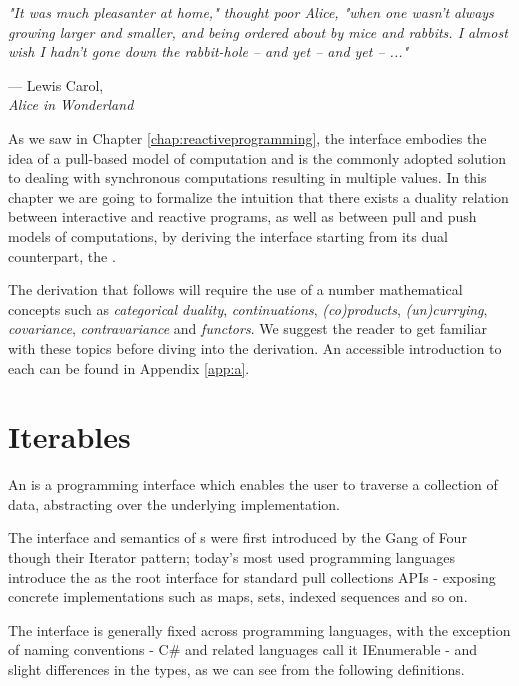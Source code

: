 \let\textcircled=\pgftextcircled
{}

\epigraph{\hspace{4ex}\textit{"It was much pleasanter at home," thought poor Alice, "when one wasn't always growing larger and smaller, and being ordered about by mice and rabbits. I almost wish I hadn't gone down the rabbit-hole -- and yet -- and yet -- ..."}}{--- Lewis Carol,\\ \textit{Alice in Wonderland}}

As we saw in Chapter \ref{chap:reactiveprogramming}, the  interface embodies the idea of a pull-based model of computation and is the commonly adopted solution to dealing with synchronous computations resulting in multiple values. In this chapter we are going to formalize the intuition that there exists a duality relation between interactive and reactive programs, as well as between pull and push models of computations, by deriving the  interface starting from its dual counterpart, the .

The derivation that follows will require the use of a number mathematical concepts such as \textit{categorical duality}, \textit{continuations}, \textit{(co)products}, \textit{(un)currying}, \textit{covariance}, \textit{contravariance} and \textit{functors}. We suggest the reader to get familiar with these topics before diving into the derivation. An accessible introduction to each can be found in Appendix \ref{app:a}.

\section{Iterables}
\label{sec:iterables}

An  is a programming interface which enables the user to traverse a collection of data, abstracting over the underlying implementation\cite{gamma1995design}.

The interface and semantics of s were first introduced by the Gang of Four though their Iterator pattern\cite{gamma1995design}; today's most used programming languages introduce the  as the root interface for standard pull collections APIs - exposing concrete implementations such as maps, sets, indexed sequences and so on. 

The  interface is generally fixed across programming languages, with the exception of naming conventions - C\# and related languages call it IEnumerable - and slight differences in the types, as we can see from the following definitions.

